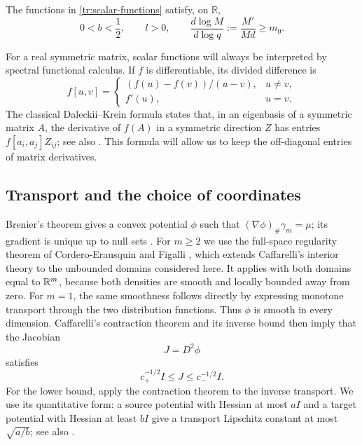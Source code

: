 \begin{lemma}\label{tr:scalar-basic}
The functions in \eqref{tr:scalar-functions} satisfy, on $\mathbb R$,
\begin{equation}\label{tr:scalar-basic-equations}
 0<b<\frac12,\qquad l>0,\qquad
 \frac{d\log M}{d\log q}
 :=\frac{M'}{Md}\ge m_0.
\end{equation}
\end{lemma}

For a real symmetric matrix, scalar functions will always be interpreted
by spectral functional calculus.  If $f$ is differentiable, its divided
difference is
\begin{equation}\label{tr:divided-difference}
 f[u,v]=\begin{cases}(f(u)-f(v))/(u-v),&u\ne v,\\f'(u),&u=v.
 \end{cases}
\end{equation}
The classical Daleckii--Krein formula
\cite{DaleckiiKrein1965} states that, in an eigenbasis of a symmetric
matrix $A$, the derivative of $f(A)$ in a symmetric direction $Z$ has
entries $f[a_i,a_j]Z_{ij}$; see also
\cite[Section~2.4]{Noferini2017}.  This formula
will allow us to keep the off-diagonal entries of matrix derivatives.

\subsection{Transport and the choice of coordinates}

Brenier's theorem gives a convex potential $\phi$ such that
$(\nabla\phi)_\#\gamma_m=\mu$; its gradient is unique up to null sets
\cite{Brenier1991,McCann1995}.  For $m\ge2$ we use the full-space
regularity theorem of Cordero-Erausquin and Figalli
\cite[Theorem~1.1]{CorderoErausquinFigalli2019}, which extends
Caffarelli's interior theory \cite{Caffarelli1992} to the unbounded
domains considered here.  It applies with both domains equal to $\mathbb R^m$, because both densities
are smooth and locally bounded away from zero.  For $m=1$, the same
smoothness follows directly by expressing monotone transport through
the two distribution functions.  Thus $\phi$ is smooth in every dimension.
Caffarelli's contraction theorem \cite{Caffarelli2000} and its inverse
bound then imply that the Jacobian
\begin{equation}\label{tr:Jacobian}
 J=D^2\phi
\end{equation}
satisfies
\begin{equation}\label{tr:Jacobian-bounds}
 c_+^{-1/2}I\le J\le c_-^{-1/2}I.
\end{equation}
For the lower bound, apply the contraction theorem to the inverse
transport.  We use its quantitative form: a source potential with
Hessian at most $aI$ and a target potential with Hessian at least $bI$
give a transport Lipschitz constant at most $\sqrt{a/b}$; see also
\cite[Theorem~1]{ChewiPooladian2023}.

